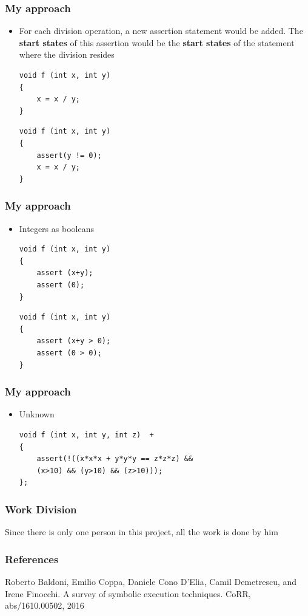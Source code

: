 \documentclass{beamer}
\begin{document}
\begin{frame}[fragile]
\frametitle{My approach}
\begin{itemize}

\item For each division operation, a new assertion statement would be added. The \textbf{start states} of this assertion would be the \textbf{start states} of the statement where the division resides

\begin{lstlisting}  
void f (int x, int y) 
{
	x = x / y;
}
\end{lstlisting}

\begin{lstlisting}  
void f (int x, int y) 
{
	assert(y != 0);
	x = x / y;
}
\end{lstlisting}

\end{itemize}
\end{frame}


\begin{frame}[fragile]
\frametitle{My approach}
\begin{itemize}

\item Integers as booleans

\begin{lstlisting}  
void f (int x, int y) 
{ 	
	assert (x+y);
	assert (0);
}
\end{lstlisting}

\begin{lstlisting}  
void f (int x, int y) 
{ 	
	assert (x+y > 0);
	assert (0 > 0);
}
\end{lstlisting}

\end{itemize}
\end{frame}


\begin{frame}[fragile]
\frametitle{My approach}
\begin{itemize}

\item Unknown

\begin{lstlisting}  
void f (int x, int y, int z)  +
{
	assert(!((x*x*x + y*y*y == z*z*z) && 
	(x>10) && (y>10) && (z>10)));
};
\end{lstlisting}


\end{itemize}
\end{frame}


\begin{frame}[fragile]
\frametitle{Work Division}
Since there is only one person in this project, all the work is done by him
\end{frame}

\begin{frame}[fragile]
\frametitle{References}
Roberto Baldoni, Emilio Coppa, Daniele Cono D’Elia, Camil Demetrescu, and Irene Finocchi.
A survey of symbolic execution techniques. CoRR, abs/1610.00502, 2016
\end{frame}
\end{document}
